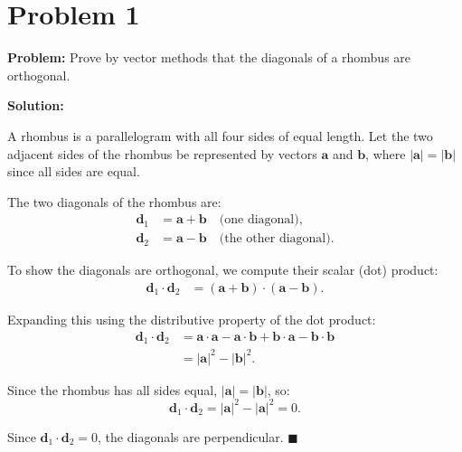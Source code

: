 \documentclass[12pt]{article}
\newcommand{\vect}[1]{\mathbf{#1}}
\begin{document}
\section*{Problem 1}

\textbf{Problem:} Prove by vector methods that the diagonals of a rhombus are orthogonal.

\bigskip
\textbf{Solution:}

A rhombus is a parallelogram with all four sides of equal length. Let the two adjacent sides of the rhombus be represented by vectors $\vect{a}$ and $\vect{b}$, where $|\vect{a}| = |\vect{b}|$ since all sides are equal.

The two diagonals of the rhombus are:
\begin{align}
\vect{d}_1 &= \vect{a} + \vect{b} \quad \text{(one diagonal)}, \\
\vect{d}_2 &= \vect{a} - \vect{b} \quad \text{(the other diagonal)}.
\end{align}

To show the diagonals are orthogonal, we compute their scalar (dot) product:
\begin{align}
\vect{d}_1 \cdot \vect{d}_2 &= (\vect{a} + \vect{b}) \cdot (\vect{a} - \vect{b}).
\end{align}

Expanding this using the distributive property of the dot product:
\begin{align}
\vect{d}_1 \cdot \vect{d}_2 &= \vect{a} \cdot \vect{a} - \vect{a} \cdot \vect{b} + \vect{b} \cdot \vect{a} - \vect{b} \cdot \vect{b} \\
&= |\vect{a}|^2 - |\vect{b}|^2.
\end{align}

Since the rhombus has all sides equal, $|\vect{a}| = |\vect{b}|$, so:
\begin{equation}
\vect{d}_1 \cdot \vect{d}_2 = |\vect{a}|^2 - |\vect{a}|^2 = 0.
\end{equation}

Since $\vect{d}_1 \cdot \vect{d}_2 = 0$, the diagonals are perpendicular. \hfill $\blacksquare$
\end{document}
